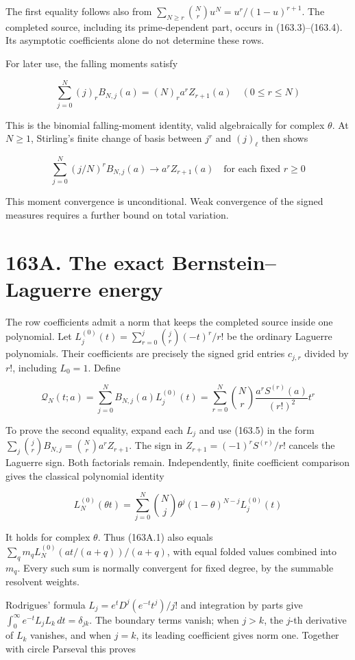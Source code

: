 \documentclass[
  11pt,
]{book}
\begin{document}
The first equality follows also from
\(\sum_{N\ge r}\binom Nr u^N=u^r/(1-u)^{r+1}\). The completed source,
including its prime-dependent part, occurs in (163.3)--(163.4). Its
asymptotic coefficients alone do not determine these rows.

For later use, the falling moments satisfy

\[
\sum_{j=0}^N(j)_rB_{N,j}(a)
=(N)_r a^rZ_{r+1}(a)\quad(0\le r\le N)
\tag{163.5}
\]

This is the binomial falling-moment identity, valid algebraically for
complex \(\theta\). At \(N\ge1\), Stirling's finite change of basis
between \(j^r\) and \((j)_\ell\) then shows

\[
\sum_{j=0}^N(j/N)^rB_{N,j}(a)\longrightarrow a^rZ_{r+1}(a)
\quad\text{for each fixed }r\ge0
\tag{163.6}
\]

This moment convergence is unconditional. Weak convergence of the signed
measures requires a further bound on total variation.

\section{163A. The exact Bernstein--Laguerre
energy}\label{a.-the-exact-bernsteinlaguerre-energy}

The row coefficients admit a norm that keeps the completed source inside
one polynomial. Let \(L_j^{(0)}(t)=\sum_{r=0}^j\binom jr(-t)^r/r!\) be
the ordinary Laguerre polynomials. Their coefficients are precisely the
signed grid entries \(c_{j,r}\) divided by \(r!\), including \(L_0=1\).
Define

\[
\mathcal Q_N(t;a)=\sum_{j=0}^N B_{N,j}(a)L_j^{(0)}(t)
=\sum_{r=0}^N\binom Nr\frac{a^rS^{(r)}(a)}{(r!)^2}t^r
\tag{163A.1}
\]

To prove the second equality, expand each \(L_j\) and use (163.5) in the
form \(\sum_j\binom jrB_{N,j}=\binom Nr a^rZ_{r+1}\). The sign in
\(Z_{r+1}=(-1)^rS^{(r)}/r!\) cancels the Laguerre sign. Both factorials
remain. Independently, finite coefficient comparison gives the classical
polynomial identity

\[
L_N^{(0)}(\theta t)=\sum_{j=0}^N\binom Nj
\theta^j(1-\theta)^{N-j}L_j^{(0)}(t)
\tag{163A.2}
\]

It holds for complex \(\theta\). Thus (163A.1) also equals
\(\sum_q m_q L_N^{(0)}(at/(a+q))/(a+q)\), with equal folded values
combined into \(m_q\). Every such sum is normally convergent for fixed
degree, by the summable resolvent weights.

Rodrigues' formula \(L_j=e^tD^j(e^{-t}t^j)/j!\) and integration by parts
give \(\int_0^\infty e^{-t}L_jL_k\,dt=\delta_{jk}\). The boundary terms
vanish; when \(j>k\), the \(j\)-th derivative of \(L_k\) vanishes, and
when \(j=k\), its leading coefficient gives norm one. Together with
circle Parseval this proves
\end{document}

